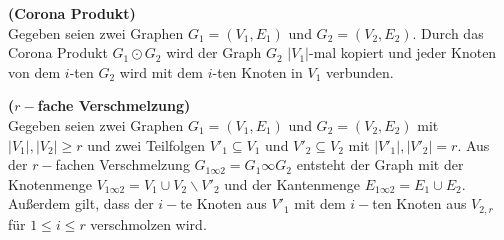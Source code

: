 \begin{defi}{\textbf{(Corona Produkt)}}\\
Gegeben seien zwei Graphen $G_1=(V_1,E_1)$ und $G_2=(V_2,E_2)$. Durch das Corona Produkt $G_1 \odot G_2$ wird der Graph $G_2$ $|V_1|$-mal kopiert und jeder Knoten von dem $i$-ten $G_2$ wird mit dem $i$-ten Knoten in $V_1$ verbunden.
\end{defi}

\begin{defi}{\textbf{($r-$fache Verschmelzung)}}\\
Gegeben seien zwei Graphen $G_1=(V_1,E_1)$ und $G_2=(V_2,E_2)$ mit $|V_1|, |V_2| \geq r$ und zwei Teilfolgen $V'_{1} \subseteq V_1$ und $V'_{2} \subseteq V_2$ mit $|V'_{1}|, |V'_{2}| = r$. Aus der $r-$fachen Verschmelzung $G_{1 \infty 2}=G_1 \infty G_2$ entsteht der Graph mit der Knotenmenge $V_{1 \infty 2}=V_1 \cup V_2\backslash V'_{2}$ und der Kantenmenge $E_{1\infty 2}= E_1 \cup E_2$. Außerdem gilt, dass der $i-$te Knoten aus $V'_{1}$ mit dem $i-$ten Knoten aus $V_{2,r}$ für $1 \leq i \leq r$ verschmolzen wird. 
\end{defi}

